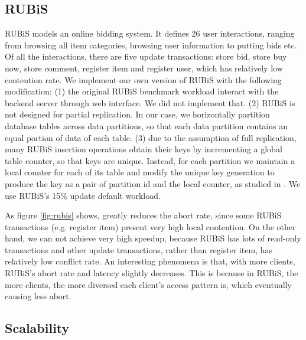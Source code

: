 \subsection{RUBiS}
RUBiS \cite{rubis} models an online bidding system. It defines 26 user interactions, ranging from browsing all item categories, browsing user information to putting bids etc. Of all the interactions, there are five update transactions: store bid, store buy now, store comment, register item and register user, which has relatively low contention rate. We implement our own version of RUBiS with the following modification: (1) the original RUBiS benchmark workload interact with the backend server through web interface. We did not implement that. (2) RUBiS is not designed for partial replication. In our case, we horizontally partition database tables across data partitions, so that each data partition contains an equal portion of data of each table. (3) due to the assumption of full replication, many RUBiS insertion operations obtain their keys by incrementing a global table counter, so that keys are unique. Instead, for each partition we maintain a local counter for each of its table and modify the unique key generation to produce the key as a pair of partition id and the local counter, as studied in \cite{cecchet2008middleware}. We use RUBiS's 15\% update default workload.

As figure \ref{fig:rubis} shows, \specula greatly reduces the abort rate, since some RUBiS transactions (e.g. register item) present very high local contention. On the other hand, we can not achieve very high speedup, because RUBiS has lots of read-only transactions and other update transactions, rather than register item, has relatively low conflict rate. An interesting phenomena is that, with more clients, RUBiS's abort rate and latency slightly decreases. This is because in RUBiS, the more clients, the more diversed each client's access pattern is, which eventually causing less abort.
\iffalse
\subsection{Scalability}

